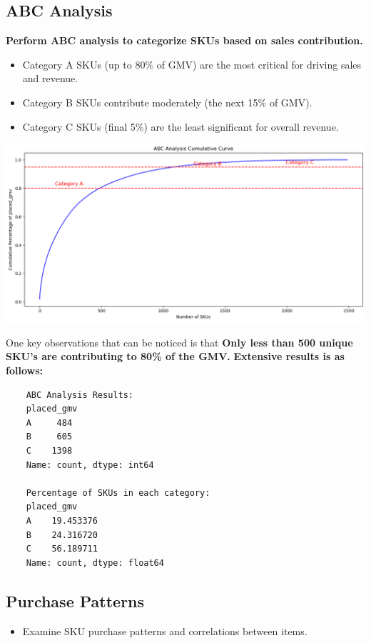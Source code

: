 \documentclass{article}
\begin{document}
    \subsection{ABC Analysis}
    \textbf{Perform ABC analysis to categorize SKUs based on sales contribution.}
    \begin{itemize}
        \item   Category A SKUs (up to 80\% of GMV) are the most critical for driving sales and revenue.
        \item Category B SKUs contribute moderately (the next 15\% of GMV).
        \item Category C SKUs (final 5\%) are the least significant for overall revenue.
    \end{itemize}
    \begin{center}
        \includegraphics[width=1\columnwidth]{images/abc.png}
    \end{center}
One key observations that can be noticed is that \textbf{Only less than 500 unique SKU's are contributing to 80\% of the GMV.}
\textbf{Extensive results is as follows:}
\begin{verbatim}
    ABC Analysis Results:
    placed_gmv
    A     484
    B     605
    C    1398
    Name: count, dtype: int64
    
    Percentage of SKUs in each category:
    placed_gmv
    A    19.453376
    B    24.316720
    C    56.189711
    Name: count, dtype: float64
\end{verbatim}


    
    \subsection{Purchase Patterns}
    \begin{itemize}
        \item Examine SKU purchase patterns and correlations between items.
    \end{itemize}
\end{document}
